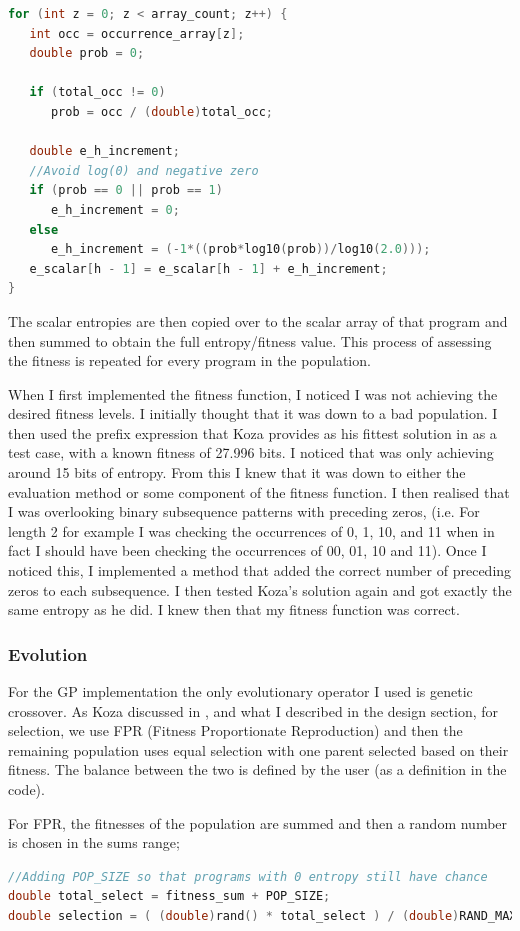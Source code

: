 \documentclass[a4paper,10.5pt]{article}
\begin{document}
\begin{lstlisting}[language=C]
for (int z = 0; z < array_count; z++) {
   int occ = occurrence_array[z];
   double prob = 0;

   if (total_occ != 0) 
      prob = occ / (double)total_occ;

   double e_h_increment;
   //Avoid log(0) and negative zero
   if (prob == 0 || prob == 1) 
      e_h_increment = 0;
   else
      e_h_increment = (-1*((prob*log10(prob))/log10(2.0)));
   e_scalar[h - 1] = e_scalar[h - 1] + e_h_increment;
}
\end{lstlisting}

The scalar entropies are then copied over to the scalar array of that program and then summed to obtain the full entropy/fitness value. This process of assessing the fitness is repeated for every program in the population.

When I first implemented the fitness function, I noticed I was not achieving the desired fitness levels. I initially thought that it was down to a bad population. I then used the prefix expression that Koza provides as his fittest solution in \cite{kozarng} as a test case, with a known fitness of 27.996 bits. I noticed that was only achieving around 15 bits of entropy. From this I knew that it was down to either the evaluation method or some component of the fitness function. I then realised that I was overlooking binary subsequence patterns with preceding zeros, (i.e. For length 2 for example I was checking the occurrences of 0, 1, 10, and 11 when in fact I should have been checking the occurrences of 00, 01, 10 and 11). Once I noticed this, I implemented a method that added the correct number of preceding zeros to each subsequence. I then tested Koza's solution again and got exactly the same entropy as he did. I knew then that my fitness function was correct.

\subsubsection{Evolution}
For the GP implementation the only evolutionary operator I used is genetic crossover. As Koza discussed in \cite{kozarng}, and what I described in the design section, for selection, we use FPR (Fitness Proportionate Reproduction) and then the remaining population uses equal selection with one parent selected based on their fitness. The balance between the two is defined by the user (as a definition in the code).

For FPR, the fitnesses of the population are summed and then a random number is chosen in the sums range;
\begin{lstlisting}[language=C]
//Adding POP_SIZE so that programs with 0 entropy still have chance
double total_select = fitness_sum + POP_SIZE; 
double selection = ( (double)rand() * total_select ) / (double)RAND_MAX;
\end{lstlisting}
\end{document}
